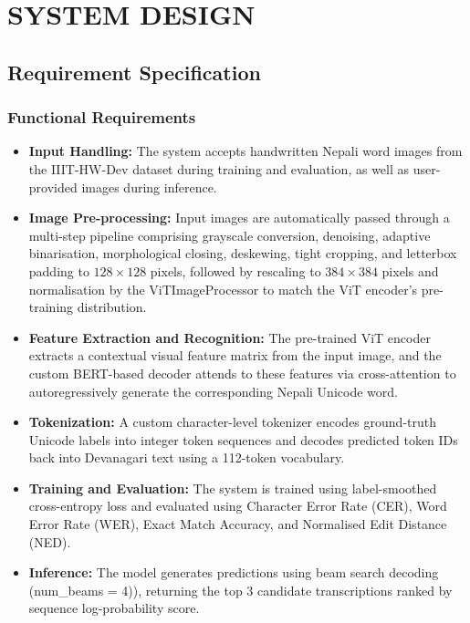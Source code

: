\chapter{SYSTEM DESIGN}

\section{Requirement Specification}

\subsection{Functional Requirements}
\begin{itemize}
    \item \textbf{Input Handling:} The system accepts handwritten Nepali word images from the IIIT-HW-Dev dataset during training and evaluation, as well as user-provided images during inference.

    \item \textbf{Image Pre-processing:} Input images are automatically passed through a multi-step pipeline comprising grayscale conversion, denoising, adaptive binarisation, morphological closing, deskewing, tight cropping, and letterbox padding to $128 \times 128$ pixels, followed by rescaling to $384 \times 384$ pixels and normalisation by the ViTImageProcessor to match the ViT encoder's pre-training distribution.

    \item \textbf{Feature Extraction and Recognition:} The pre-trained ViT encoder extracts a contextual visual feature matrix from the input image, and the custom BERT-based decoder  attends to these features via cross-attention to autoregressively generate the corresponding Nepali Unicode word.

    \item \textbf{Tokenization:} A custom character-level tokenizer encodes ground-truth Unicode labels into integer token sequences and decodes predicted token IDs back into Devanagari text using a 112-token vocabulary.

    \item \textbf{Training and Evaluation:} The system is trained using label-smoothed cross-entropy loss and evaluated using Character Error Rate (CER), Word Error Rate (WER), Exact Match Accuracy, and Normalised Edit Distance (NED).

    \item \textbf{Inference:} The model generates predictions using beam search decoding (num\_beams = 4)), returning the top 3 candidate transcriptions ranked by sequence log-probability score.


\end{itemize}
